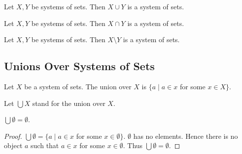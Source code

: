 \documentclass[10pt]{article}
\begin{document}
  \begin{forthel}
    \begin{proposition}
      Let $X, Y$ be systems of sets.
      Then $X \cup Y$ is a system of sets.
    \end{proposition}
  \end{forthel}

  \begin{forthel}
    \begin{proposition}
      Let $X, Y$ be systems of sets.
      Then $X \cap Y$ is a system of sets.
    \end{proposition}
  \end{forthel}

  \begin{forthel}
    \begin{proposition}
      Let $X, Y$ be systems of sets.
      Then $X \setminus Y$ is a system of sets.
    \end{proposition}
  \end{forthel}


  \subsection*{Unions Over Systems of Sets}

  \begin{forthel}
    \begin{definition}[id=FOUNDATIONS_10_541772562300928,printid]
      Let $X$ be a system of sets.
      The union over $X$ is $\{ a \mid a \in x$ for some $x \in X \}$.
    \end{definition}

    Let $\bigcup X$ stand for the union over $X$.
  \end{forthel}

  \begin{forthel}
    \begin{proposition}[id=FOUNDATIONS_10_4872701241982976,printid]
      $\bigcup \emptyset = \emptyset$.
    \end{proposition}
    \begin{proof}
      $\bigcup \emptyset = \{ a \mid a \in x$ for some $x \in \emptyset \}$.
      $\emptyset$ has no elements.
      Hence there is no object $a$ such that $a \in x$ for some $x \in \emptyset$.
      Thus $\bigcup \emptyset = \emptyset$.
    \end{proof}
  \end{forthel}
\end{document}
